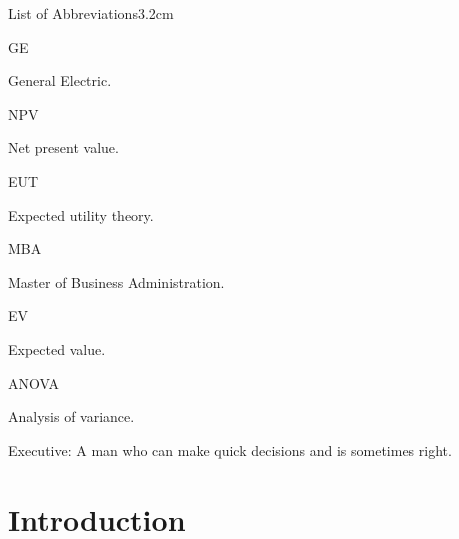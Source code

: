\documentclass[a4paper, nobind]{templates/ociamthesis}
\theoremstyle{definition}
\theoremstyle{definition}
\theoremstyle{definition}
\theoremstyle{definition}
\theoremstyle{remark}
\begin{document}
\begin{romanpages}
\tableofcontents

\listoffigures
	\mtcaddchapter

\listoftables
  \mtcaddchapter
\begin{mclistof}{List of Abbreviations}{3.2cm}

\item[GE]

General Electric.

\item[NPV]

Net present value.

\item[EUT]

Expected utility theory.

\item[MBA]

Master of Business Administration.

\item[EV]

Expected value.

\item[ANOVA]

Analysis of variance.

\end{mclistof} 


\end{romanpages}

\flushbottom



\begin{savequote}
Executive: A man who can make quick decisions and is sometimes right.
\end{savequote}

\hypertarget{introduction}{%
\chapter{Introduction}\label{introduction}}
\end{document}
